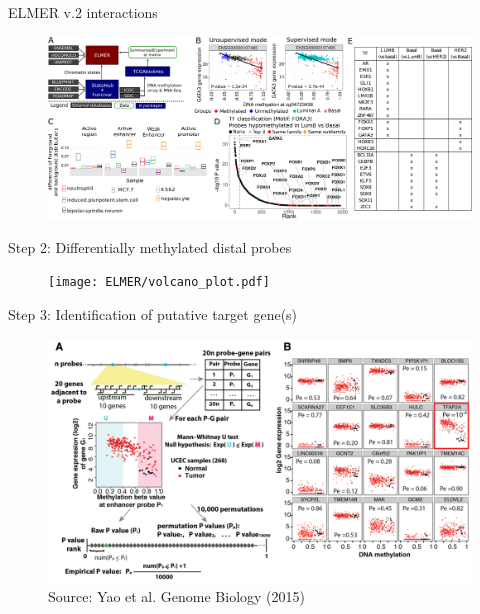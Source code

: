 \documentclass[slidestop,compress,11pt,xcolor=dvipsnames]{beamer}
\begin{document}
\begin{frame}{ELMER v.2 interactions}

 \begin{figure}
  \centering
  \includegraphics[width=1.0\linewidth]{ELMER/painel_A.pdf} \end{figure}
\end{frame}


\begin{frame}{Step 2: Differentially methylated distal probes}
 \begin{figure}
  \centering
  \texttt{[image: ELMER/volcano\_plot.pdf]}
 \end{figure}
\end{frame}

\begin{frame}{Step 3: Identification of putative target gene(s)}
 \vspace*{-0.4cm}
 \begin{figure}
\hspace*{-0.5cm}
\includegraphics[width=1.1\linewidth]{ELMER/pair.png}{\tiny{\\\vspace{-0.3cm}Source: Yao et al. Genome Biology (2015)}}
 \end{figure}
\end{frame}
\end{document}
